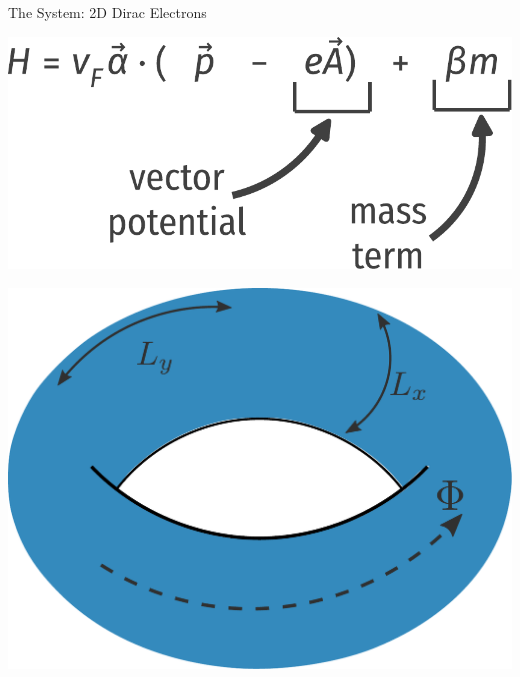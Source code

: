 \documentclass[12pt,aspectratio=169]{beamer}
\begin{document}
\begin{frame}{The System: 2D Dirac Electrons}
{\begin{minipage}{0.4\textwidth}
\includegraphics[width=\textwidth]{figures/diracHamiltonian.pdf}
\end{minipage}
\hspace*{\fill}
\begin{minipage}{0.4\textwidth}
\includegraphics[width=\textwidth]{figures/torus.pdf}
\end{minipage}
}
\end{frame}
\end{document}
